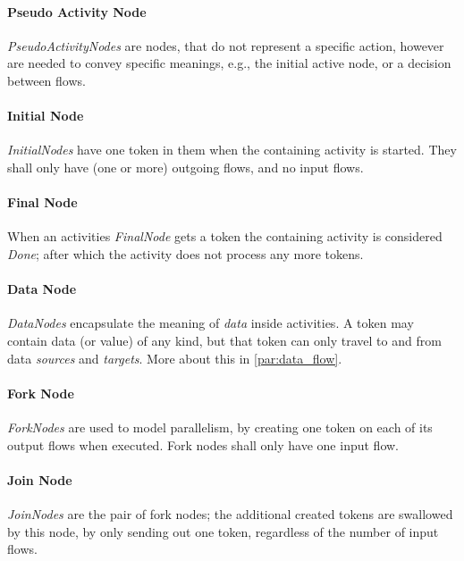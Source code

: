 \paragraph{Pseudo Activity Node}

\emph{PseudoActivityNodes} are nodes, that do not represent a specific action, however are needed to convey specific meanings, e.g., the initial active node, or a decision between flows.

\paragraph{Initial Node}

\emph{InitialNodes} have one token in them when the containing activity is started. They shall only have (one or more) outgoing flows, and no input flows. 

\paragraph{Final Node}

When an activities \emph{FinalNode} gets a token the containing activity is considered \emph{Done}; after which the activity does not process any more tokens.

\paragraph{Data Node}

\emph{DataNodes} encapsulate the meaning of \emph{data} inside activities. A token may contain data (or value) of any kind, but that token can only travel to and from data \emph{sources} and \emph{targets}. More about this in \autoref{par:data_flow}.

\paragraph{Fork Node}

\emph{ForkNodes} are used to model parallelism, by creating one token on each of its output flows when executed. Fork nodes shall only have one input flow.

\paragraph{Join Node}

\emph{JoinNodes} are the pair of fork nodes; the additional created tokens are swallowed by this node, by only sending out one token, regardless of the number of input flows.


